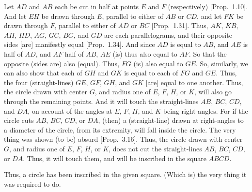 \begin{Parallel}{}{}
{\epsfysize=2.2in
\centerline{}

Let  $AD$ and $AB$ each be cut in half at points $E$ and $F$ (respectively)
[Prop.~1.10]. And let $EH$ be drawn through $E$, parallel
to either of $AB$ or $CD$, and let $FK$ be drawn through $F$, parallel to either of $AD$ or $BC$ [Prop.~1.31].
Thus, $AK$, $KB$, $AH$, $HD$, $AG$, $GC$, $BG$, and $GD$ are each parallelograms,
and their opposite sides [are] manifestly equal [Prop.~1.34].
And since $AD$ is equal to $AB$, and $AE$ is half of $AD$, and $AF$ half of
$AB$, $AE$ (is) thus also equal to $AF$. So that the opposite (sides are) also (equal).
Thus, $FG$ (is) also equal to $GE$. So, similarly, we can also show that each of
$GH$ and $GK$ is equal to each of $FG$ and $GE$. Thus, the four (straight-lines)
$GE$, $GF$, $GH$, and $GK$ [are] equal to one another. Thus, the circle drawn
with center $G$, and radius one of $E$, $F$, $H$, or $K$, will also go through the remaining points. And it will touch the straight-lines $AB$, $BC$, $CD$, and $DA$,
on account of the angles at $E$, $F$, $H$, and $K$ being right-angles. For if the
circle cuts $AB$, $BC$, $CD$, or $DA$, (then) a (straight-line) drawn at right-angles to a diameter of the circle, from its extremity, will fall inside the circle. 
The very thing was shown (to be) absurd [Prop.~3.16].  Thus, the
circle drawn with center $G$, and radius one of $E$, $F$, $H$, or $K$, does not
cut the straight-lines $AB$, $BC$, $CD$, or $DA$. Thus, it will touch them, and will
be inscribed in the square $ABCD$.

Thus, a circle has been inscribed in the given square. (Which is) the very thing it was required to do.}
\end{Parallel}

